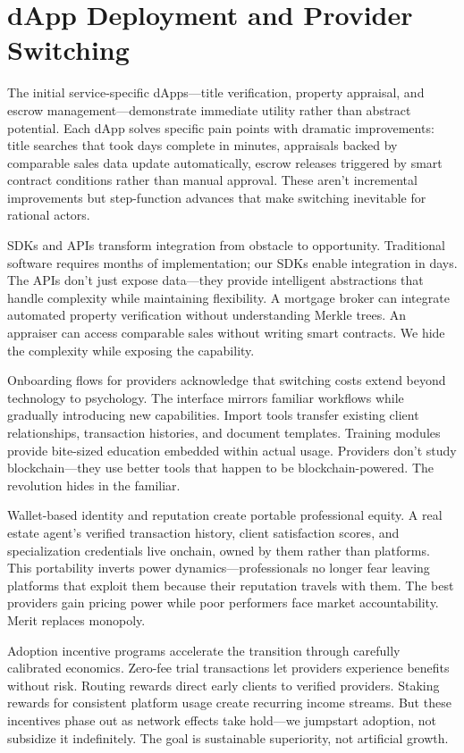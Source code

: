 \section{dApp Deployment and Provider Switching}

The initial service-specific dApps—title verification, property appraisal, and escrow management—demonstrate immediate utility rather than abstract potential. Each dApp solves specific pain points with dramatic improvements: title searches that took days complete in minutes, appraisals backed by comparable sales data update automatically, escrow releases triggered by smart contract conditions rather than manual approval. These aren't incremental improvements but step-function advances that make switching inevitable for rational actors.

SDKs and APIs transform integration from obstacle to opportunity. Traditional software requires months of implementation; our SDKs enable integration in days. The APIs don't just expose data—they provide intelligent abstractions that handle complexity while maintaining flexibility. A mortgage broker can integrate automated property verification without understanding Merkle trees. An appraiser can access comparable sales without writing smart contracts. We hide the complexity while exposing the capability.

Onboarding flows for providers acknowledge that switching costs extend beyond technology to psychology. The interface mirrors familiar workflows while gradually introducing new capabilities. Import tools transfer existing client relationships, transaction histories, and document templates. Training modules provide bite-sized education embedded within actual usage. Providers don't study blockchain—they use better tools that happen to be blockchain-powered. The revolution hides in the familiar.

Wallet-based identity and reputation create portable professional equity. A real estate agent's verified transaction history, client satisfaction scores, and specialization credentials live onchain, owned by them rather than platforms. This portability inverts power dynamics—professionals no longer fear leaving platforms that exploit them because their reputation travels with them. The best providers gain pricing power while poor performers face market accountability. Merit replaces monopoly.

Adoption incentive programs accelerate the transition through carefully calibrated economics. Zero-fee trial transactions let providers experience benefits without risk. Routing rewards direct early clients to verified providers. Staking rewards for consistent platform usage create recurring income streams. But these incentives phase out as network effects take hold—we jumpstart adoption, not subsidize it indefinitely. The goal is sustainable superiority, not artificial growth.

